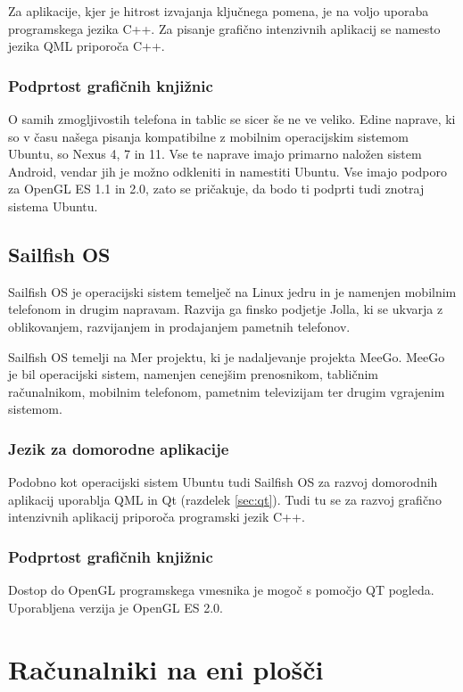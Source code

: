 Za aplikacije, kjer je hitrost izvajanja ključnega pomena, je na voljo uporaba programskega jezika C++. Za pisanje grafično intenzivnih aplikacij se namesto jezika QML priporoča C++.

\subsubsection{Podprtost grafičnih knjižnic}

O samih zmogljivostih telefona in tablic se sicer še ne ve veliko. Edine naprave, ki so v času našega pisanja kompatibilne z mobilnim operacijskim sistemom Ubuntu, so Nexus 4, 7 in 11. Vse te naprave imajo primarno naložen sistem Android, vendar jih je možno odkleniti in namestiti Ubuntu. Vse imajo podporo za OpenGL ES 1.1 in 2.0, zato se pričakuje, da bodo ti podprti tudi znotraj sistema Ubuntu.

\subsection{Sailfish OS}

Sailfish OS \cite{sailfishos} je operacijski sistem temelječ na Linux jedru in je namenjen mobilnim telefonom in drugim napravam. Razvija ga finsko podjetje Jolla, ki se ukvarja z oblikovanjem, razvijanjem in prodajanjem pametnih telefonov.

Sailfish OS temelji na Mer projektu, ki je nadaljevanje projekta MeeGo. MeeGo je bil operacijski sistem, namenjen cenejšim prenosnikom, tabličnim računalnikom, mobilnim telefonom, pametnim televizijam ter drugim vgrajenim sistemom. 

\subsubsection{Jezik za domorodne aplikacije}

Podobno kot operacijski sistem Ubuntu tudi Sailfish OS za razvoj domorodnih aplikacij uporablja QML in Qt (razdelek \ref{sec:qt}). Tudi tu se za razvoj grafično intenzivnih aplikacij priporoča programski jezik C++.

\subsubsection{Podprtost grafičnih knjižnic}

Dostop do OpenGL programskega vmesnika je mogoč s pomočjo QT pogleda. Uporabljena verzija je OpenGL ES 2.0.

\section{Računalniki na eni plošči}

